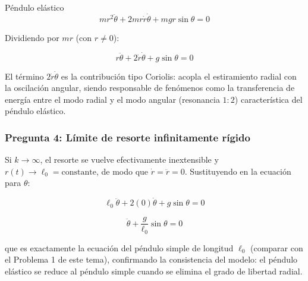 \begin{solucion}{Péndulo elástico}
$$mr^2\ddot\theta + 2mr\dot{r}\dot\theta + mgr\sin\theta = 0$$

Dividiendo por $mr$ (con $r\neq0$):

$$\boxed{r\ddot\theta + 2\dot{r}\dot\theta + g\sin\theta = 0}$$

El término $2\dot r\dot\theta$ es la contribución tipo Coriolis: acopla el estiramiento radial con la oscilación angular, siendo responsable de fenómenos como la transferencia de energía entre el modo radial y el modo angular (resonancia $1{:}2$) característica del péndulo elástico.

\subsubsection*{Pregunta 4: Límite de resorte infinitamente rígido}

Si $k\to\infty$, el resorte se vuelve efectivamente inextensible y $r(t) \to \ell_0 = \text{constante}$, de modo que $\dot{r}=\ddot{r}=0$. Sustituyendo en la ecuación para $\theta$:

$$\ell_0\ddot\theta + 2(0)\dot\theta + g\sin\theta = 0$$

$$\boxed{\ddot\theta + \frac{g}{\ell_0}\sin\theta = 0}$$

que es exactamente la ecuación del péndulo simple de longitud $\ell_0$ (comparar con el Problema 1 de este tema), confirmando la consistencia del modelo: el péndulo elástico se reduce al péndulo simple cuando se elimina el grado de libertad radial.
\end{solucion}
